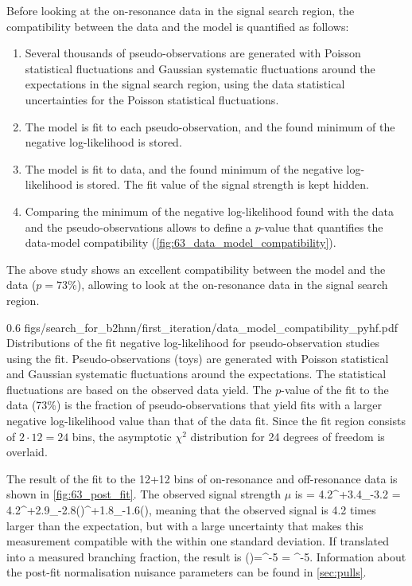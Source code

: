 Before looking at the on-resonance data in the signal search region, the compatibility between the data and the \pyhf model is quantified as follows:
\begin{enumerate}
\item Several thousands of pseudo-observations are generated with Poisson statistical fluctuations and Gaussian systematic fluctuations around the expectations in the signal search region, using the data statistical uncertainties for the Poisson statistical fluctuations.
\item The \pyhf model is fit to each pseudo-observation, and the found minimum of the negative log-likelihood is stored.
\item The \pyhf model is fit to data, and the found minimum of the negative log-likelihood is stored.
The fit value of the signal strength is kept hidden.
\item Comparing the minimum of the negative log-likelihood found with the data and the pseudo-observations allows to define a $p$-value that quantifies the data-model compatibility (\cref{fig:63_data_model_compatibility}).
\end{enumerate}
The above study shows an excellent compatibility between the model and the data ($p=73\%$), allowing to look at the on-resonance data in the signal search region.

{0.6}
{figs/search_for_b2hnn/first_iteration/data_model_compatibility_pyhf.pdf}
{
Distributions of the fit negative log-likelihood for pseudo-observation studies using the \pyhf fit.
Pseudo-observations (toys) are generated with Poisson statistical and Gaussian systematic fluctuations around the expectations.
The statistical fluctuations are based on the observed data yield.
The $p$-value of the fit to the data (73\%) is the fraction of pseudo-observations that yield fits with a larger negative log-likelihood  value than that of the data fit.
Since the fit region consists of $2\cdot12=24$ bins, the asymptotic $\chi^2$ distribution for 24 degrees of freedom is overlaid.
}

The result of the fit to the 12+12 bins of on-resonance and off-resonance data is shown in \cref{fig:63_post_fit}.
The observed signal strength $\mu$ is
\be \label{eq:result_mu}
\mu = 4.2^{+3.4}_{-3.2} = 4.2^{+2.9}_{-2.8}(){}^{+1.8}_{-1.6}(),
\ee
meaning that the observed signal is 4.2 times larger than the \SM expectation, but with a large uncertainty that makes this measurement compatible with the \SM within one standard deviation.
If translated into a measured branching fraction, the result is
\be
\mathrm{\Br}(\BKpnn)=\left[1.9^{+1.6}_{-1.5}\right] ^{-5} =  ^{-5}.
\ee
Information about the post-fit normalisation nuisance parameters can be found in \cref{sec:pulls}.

